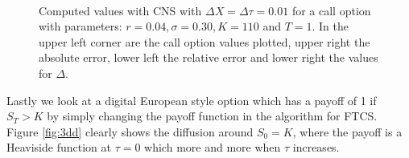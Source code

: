 \documentclass[11pt,a4paper]{article}
\begin{document}
\begin{figure}[H]
  \centering
   \\
  \caption{Computed values with CNS with $\Delta X=\Delta \tau=0.01$ for a call option with parameters: $r = 0.04, \sigma = 0.30, K = 110$ and $T = 1$. In the upper left corner are the call option values plotted, upper right the absolute error, lower left the relative error and lower right the values for $\Delta$.}
  \label{fig:CN}
\end{figure}

Lastly we look at a digital European style option which has a payoff of 1 if $S_T>K$ by simply changing the payoff function in the algorithm for FTCS. Figure \ref{fig:3dd} clearly shows the diffusion around $S_0=K$, where the payoff is a Heaviside function at $\tau = 0$ which more and more when $\tau$ increases.
\end{document}
